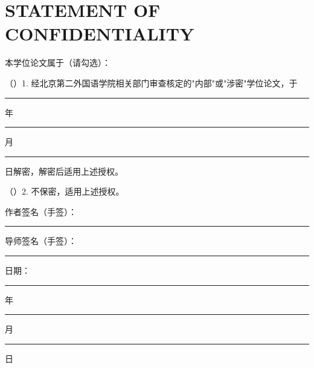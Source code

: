 
\chapter*{STATEMENT OF CONFIDENTIALITY}

\noindent
本学位论文属于（请勾选）：

\vspace{0.5cm}

\noindent
（\hspace{0.5cm}）1. 经北京第二外国语学院相关部门审查核定的"内部"或"涉密"学位论文，于 \rule{1.5cm}{0.4pt} 年 \rule{1cm}{0.4pt} 月 \rule{1cm}{0.4pt} 日解密，解密后适用上述授权。

\vspace{0.3cm}

\noindent
（\hspace{0.5cm}）2. 不保密，适用上述授权。

\vspace{2cm}

\noindent
\begin{minipage}[t]{0.45\textwidth}
作者签名（手签）：\rule{3cm}{0.4pt}
\end{minipage}
\hfill
\begin{minipage}[t]{0.45\textwidth}
导师签名（手签）：\rule{3cm}{0.4pt}
\end{minipage}

\vspace{0.5cm}

\hfill 日期：\rule{1.5cm}{0.4pt} 年 \rule{1cm}{0.4pt} 月 \rule{1cm}{0.4pt} 日
